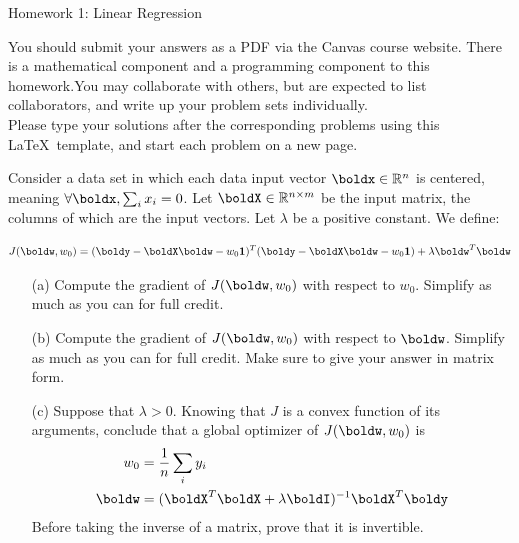 \documentclass[submit]{harvardml}
\begin{document}
\begin{center}
{\Large Homework 1: Linear Regression}\\
\end{center}
You should submit your answers as a PDF via the Canvas course website.  There is a mathematical component and a programming component to this homework.You may collaborate with others, but are expected to list collaborators, and write up your problem sets individually.\\

\noindent
Please type your solutions after the corresponding problems using this \LaTeX\ template, and start each problem on a new page.\\

\begin{problem}

Consider a data set in which each data input vector $\boldx \in \mathbb{R}^n$ is
centered, meaning $\forall \boldx, \sum_i x_i = 0$. Let $\boldX \in
\mathbb{R}^{n \times m}$ be the input matrix, the columns of which are the input
vectors. Let $\lambda$ be a positive constant. We define:

$$J(\boldw, w_0) = (\boldy - \boldX \boldw - w_0 {\bf 1 })^T (\boldy - \boldX
\boldw - w_0 {\bf 1 }) + \lambda \boldw^T \boldw$$

\begin{itemize}
  \item[(a)] Compute the gradient of $J(\boldw, w_0)$ with respect to $w_0$.
    Simplify as much as you can for full credit.
  \item[(b)] Compute the gradient of $J(\boldw, w_0)$ with respect to $\boldw$.
    Simplify as much as you can for full credit. Make sure to give your answer
    in matrix form.
  \item[(c)] Suppose that $\lambda > 0$. Knowing that $J$ is a convex function
    of its arguments, conclude that a global optimizer of
    $J(\boldw, w_0)$ is
    \begin{align}
      w_0 &= \frac{1}{n} \sum_i y_i \\
      \boldw &= (\boldX^T \boldX + \lambda \boldI)^{-1} \boldX^T \boldy
    \end{align}
    Before taking the inverse of a matrix, prove that it is invertible.
\end{itemize}
\end{problem}
\end{document}
